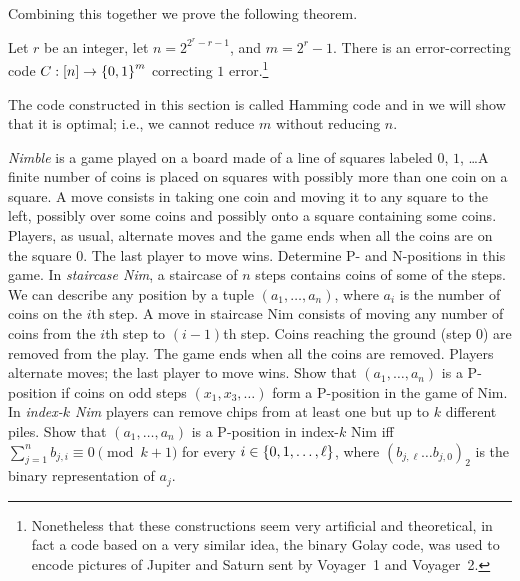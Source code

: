 Combining this together we prove the following theorem.
\begin{theorem}
  Let $r$ be an integer, let $n = 2^{2^r - r - 1}$, and $m = 2^r - 1$.
  There is an error-correcting code $C : \range{n} \to \set{0, 1}^m$
  correcting $1$ error.\footnote{%
    Nonetheless that these constructions seem very artificial and theoretical,
    in fact a code based on a very similar idea, the binary Golay code, was used
    to encode pictures of Jupiter and Saturn sent by Voyager~1 and Voyager~2.
  }
\end{theorem}
The code constructed in this section is called Hamming code and in
 we will show that it is optimal; i.e., we cannot reduce
$m$ without reducing $n$.

\begin{chapterendexercises}
  \exercise \emph{Nimble} is a game played on a board made of a line of squares
    labeled $0$, $1$, \dots A finite number of coins is placed on squares with
    possibly more than one coin on a square. A move consists in taking one coin
    and moving it to any square to the left, possibly over some coins and
    possibly onto a square containing some coins. Players, as usual, alternate
    moves and the game ends when all the coins are on the square $0$. The last
    player to move wins. Determine P- and N-positions in this game.
  \exercise In \emph{staircase Nim}, a staircase of $n$ steps contains coins of
    some of the steps. We can describe any position by a tuple $(a_1, \dots, a_n)$,
    where $a_i$ is the number of coins on the $i$th step. A move in staircase
    Nim consists of moving any number of coins from the $i$th step to 
    $(i - 1)$th step. Coins reaching the ground (step $0$) are removed from the
    play. The game ends when all the coins are removed. Players alternate moves;
    the last player to move wins. Show that $(a_1, \dots, a_n)$ is a P-position
    if coins on odd steps $(x_1, x_3, \dots)$ form a P-position in the game of
    Nim.
  \exercise In \emph{index-$k$ Nim} players can remove chips from at least
    one but up to $k$ different piles. Show that $(a_1, \dots, a_n)$ is a
    P-position in index-$k$ Nim iff 
    $\sum_{j = 1}^n b_{j, i} \equiv 0 \pmod{k + 1}$ for every 
    $i \in \set{0, 1, \dots, \ell}$, where $(b_{j, \ell} \dots b_{j, 0})_2$ is
    the binary representation of $a_j$.
\end{chapterendexercises}
